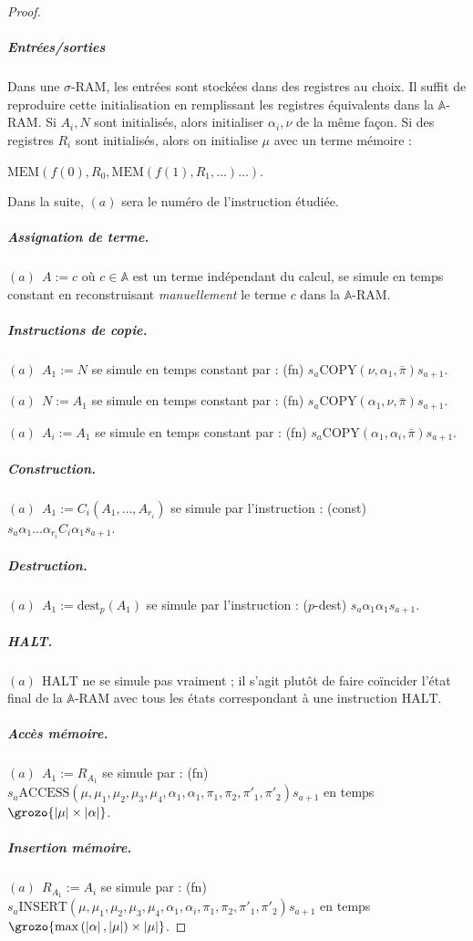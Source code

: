 \documentclass{report}
\newcommand{\bbA}{\mathbb{A}}
\begin{document}
\begin{proof}
						\subparagraph{Entrées/sorties}
						Dans une $\sigma$-RAM, les entrées sont stockées dans des registres au choix. Il suffit de reproduire cette initialisation en remplissant les registres équivalents dans la $\bbA$-RAM. Si $A_i, N$ sont initialisés, alors initialiser $\alpha_i, \nu$ de la même façon. Si des registres $R_i$ sont initialisés, alors on initialise $\mu$ avec un terme mémoire : 
						
						$\text{MEM}\left( f(0), R_0, \text{MEM}\left( f(1), R_1, \dots \right) \dots \right)$.
						
						Dans la suite, $(a)$ sera le numéro de l'instruction étudiée. 
						
						\subparagraph{Assignation de terme.}
						$(a) \:\: A := c$ où $c \in \bbA$ est un terme indépendant du calcul, se simule en temps constant en reconstruisant \emph{manuellement} le terme $c$ dans la $\bbA$-RAM. 
						
						\subparagraph{Instructions de copie.}
						$(a) \:\: A_1 := N$ se simule en temps constant par : (fn) $s_a \text{COPY}(\nu, \alpha_1, \bar{\pi}) s_{a+1}$.
						 
						$(a) \:\: N := A_1$ se simule en temps constant par : (fn) $s_a \text{COPY}(\alpha_1, \nu, \bar{\pi}) s_{a+1}$.
						
						$(a) \:\: A_i := A_1$ se simule en temps constant par : (fn) $s_a \text{COPY}(\alpha_1, \alpha_i, \bar{\pi}) s_{a+1}$.
					
						\subparagraph{Construction.}
						$(a) \:\: A_1 := C_i(A_1, \dots, A_{r_i})$ se simule par l'instruction : (const) $s_a \alpha_1 \dots \alpha_{r_i} C_i \alpha_1 s_{a+1}$.
						
						\subparagraph{Destruction.}
						$(a) \:\: A_1 := \text{dest}_p(A_1)$ se simule par l'instruction : ($p$-dest) $s_a \alpha_1 \alpha_1 s_{a+1}$.
						
						\subparagraph{HALT.}
						$(a) \:\: \text{HALT}$ ne se simule pas vraiment ; il s'agit plutôt de faire coïncider l'état final de la $\bbA$-RAM avec tous les états correspondant à une instruction $\text{HALT}$. 
						
						\subparagraph{Accès mémoire.}
						$(a) \:\: A_1 := R_{A_1}$ se simule par : (fn) $s_a \text{ACCESS}\left( \mu, \mu_1, \mu_2, \mu_3, \mu_4, \alpha_1, \alpha_1, \pi_1, \pi_2, \pi'_1, \pi'_2\right) s_{a+1}$ en temps $\grozo{\left| \mu \right| \times \left| \alpha \right|}$.
						
						\subparagraph{Insertion mémoire.}
						$(a) \:\: R_{A_1} := A_i$ se simule par : (fn) $s_a \text{INSERT}\left( \mu, \mu_1, \mu_2, \mu_3, \mu_4, \alpha_1, \alpha_i, \pi_1, \pi_2, \pi'_1, \pi'_2\right) s_{a+1}$ en temps $\grozo{\max\left( \left| \alpha \right|, \left| \mu \right| \right)\times \left| \mu \right|}$. 
						

\end{proof}
\end{document}
